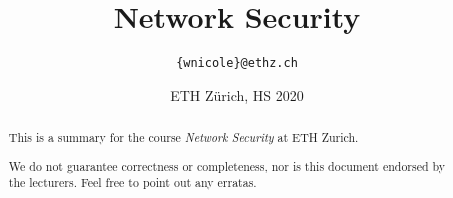 \documentclass[paper=a4, parskip=half-]{scrartcl}
\title{Network Security}
\author{\texttt{\{wnicole\}@ethz.ch}}
\date{ETH Zürich, HS 2020}
\begin{document}
\begin{titlepage}
\maketitle
\vspace{5cm}
\thispagestyle{empty}


\begin{abstract}
This is a summary for the course \textit{Network Security} at ETH Zurich.

We do not guarantee correctness or completeness, nor is this document endorsed by the lecturers.
Feel free to point out any erratas.
\end{abstract}

\end{titlepage}

\tableofcontents
\newpage



\newpage


\newpage


\newpage


\newpage


\newpage


\newpage


\newpage


\newpage


\newpage


\newpage


\newpage


\newpage


\newpage


\newpage


\newpage


\newpage


\newpage


\newpage
\end{document}
